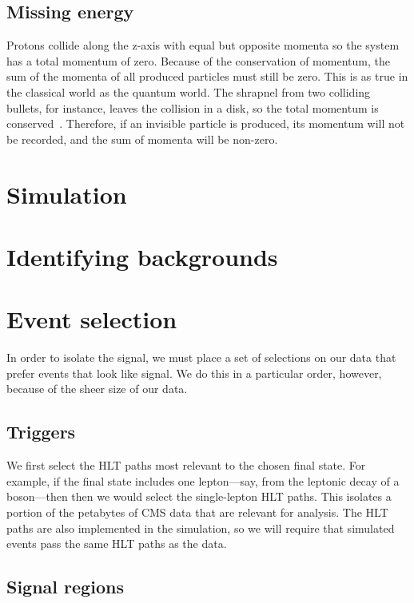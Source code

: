 \subsection{Missing energy}\label{sec:met}
Protons collide along the z-axis with equal but opposite momenta so the system has a total momentum of zero. 
Because of the conservation of momentum, the sum of the momenta of all produced particles must still be zero. 
This is as true in the classical world as the quantum world. 
The shrapnel from two colliding bullets, for instance, leaves the collision in a disk, so the total momentum is conserved~\cite{SmarterEveryDayBullets}. 
Therefore, if an invisible particle is produced, its momentum will not be recorded, and the sum of momenta will be non-zero. 

\section{Simulation}

\section{Identifying backgrounds}

\section{Event selection}
In order to isolate the signal, we must place a set of selections on our data that prefer events that look like signal. 
We do this in a particular order, however, because of the sheer size of our data. %

\subsection{Triggers}
We first select the HLT paths most relevant to the chosen final state. 
For example, if the final state includes one lepton---say, from the leptonic decay of a \PW boson---then then we would select the single-lepton HLT paths. 
This isolates a portion of the petabytes of CMS data that are relevant for analysis. 
The HLT paths are also implemented in the simulation, so we will require that simulated events pass the same HLT paths as the data. 

\subsection{Signal regions}
